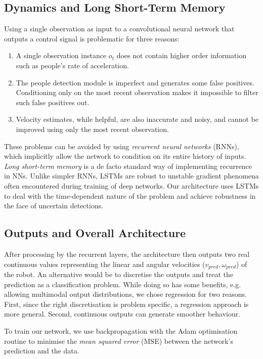 \documentclass[letterpaper, 10 pt, conference]{ieeeconf}
\begin{document}
\subsection{Dynamics and Long Short-Term Memory}
Using a single observation as input to a convolutional neural network that outputs a control signal is problematic for three reasons:

\begin{enumerate}
\item A single observation instance $o_t$ does not contain higher order information such as people's rate of  acceleration.
\item The people detection module is imperfect and generates some false positives.  Conditioning only on the most recent observation makes it impossible to filter such false positives out.
\item Velocity estimates, while helpful, are also inaccurate and noisy, and cannot be improved using only the most recent observation.
\end{enumerate}

These problems can be avoided by using \emph{recurrent neural networks} (RNNs), which implicitly allow the network to condition on its entire history of inputs.  \emph{Long short-term memory} \cite{hochreiter1997long} is a de facto standard way of implementing recurrence in NNs. Unlike simpler RNNs, LSTMs are robust to unstable gradient phenomena often encountered during training of deep networks. Our architecture uses LSTMs to deal with the time-dependent nature of the problem and achieve robustness in the face of uncertain detections.

\subsection{Outputs and Overall Architecture}
After processing by the recurrent layers, the architecture then outputs two real continuous values representing the linear and angular velocities ($v_{pred},\omega_{pred}$) of the robot. An alternative would be to discretise the outputs and treat the prediction as a classification problem. While doing so has some benefits, e.g. allowing multimodal output distributions, we chose regression for two reasons. First, since the right discretisation is problem specific, a regression approach is more general. Second, continuous outputs can generate smoother behaviour. 

To train our network, we use backpropagation with the Adam \cite{kingma2014adam} optimisation routine to minimise the \emph{mean squared error} (MSE) between the network's prediction and the data. 
\end{document}
